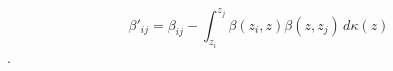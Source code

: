 \begin{equation}
\beta'_{ij} = \beta_{ij} - \int_{z_i}^{z_j} \beta(z_i,z) \beta(z,z_j)\,d\kappa(z)
\end{equation}
.